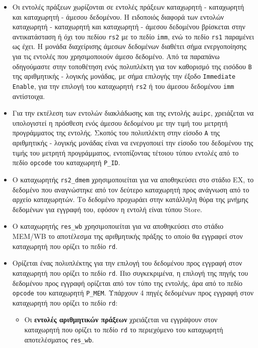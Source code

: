 \documentclass[11pt]{extarticle}
\begin{document}
\begin{itemize}
    \item Οι εντολές πράξεων χωρίζονται σε εντολές πράξεων καταχωρητή - καταχωρητή και καταχωρητή - άμεσου δεδομένου.
    Η ειδοποιός διαφορά των εντολών καταχωρητή - καταχωρητή και καταχωρητή - άμεσου δεδομένου βρίσκεται στην αντικατάσταση ή όχι του πεδίου \texttt{rs2} με το πεδίο \texttt{imm}, ενώ το πεδίο \texttt{rs1} παραμένει ως έχει.
    Η μονάδα διαχείρισης άμεσων δεδομένων διαθέτει σήμα ενεργοποίησης για τις εντολές που χρησιμοποιούν άμεσο δεδομένο.
    Από τα παραπάνω οδηγούμαστε στην τοποθέτηση ενός πολυπλέκτη για τον καθορισμό της εισόδου \texttt{B} της αριθμητικής - λογικής μονάδας, με σήμα επιλογής την έξοδο \texttt{Immediate Enable}, για την επιλογή του καταχωρητή \texttt{rs2} ή του άμεσου δεδομένου \texttt{imm} αντίστοιχα.
    \item Για την εκτέλεση των εντολών διακλάδωσης και της εντολής \texttt{auipc}, χρειάζεται να υπολογιστεί η πρόσθεση ενός άμεσου δεδομένου με την τιμή του μετρητή προγράμματος της εντολής.
    Σκοπός του πολυπλέκτη στην είσοδο \texttt{A} της αριθμητικής - λογικής μονάδας είναι να ενεργοποιεί την είσοδο του δεδομένου της τιμής του μετρητή προγράμματος, εντοπίζοντας τέτοιου τύπου εντολές από το πεδίο \texttt{opcode} του καταχωρητή \texttt{P\_ID}.
    \item Ο καταχωρητής \texttt{rs2\_dmem} χρησιμοποιείται για να αποθηκεύσει στο στάδιο EX, το δεδομένο που αναγνώστηκε από τον δεύτερο καταχωρητή προς ανάγνωση από το αρχείο καταχωρητών.
    Το δεδομένο προχωράει στην κατάλληλη θύρα της μνήμης δεδομένων για εγγραφή του, εφόσον η εντολή είναι τύπου Store.
    \item Ο καταχωρητής \texttt{res\_wb} χρησιμοποιείται για να αποθηκεύσει στο στάδιο MEM/WB το αποτέλεσμα της αριθμητικής πράξης το οποίο θα εγγραφεί στον καταχωρητή που ορίζει το πεδίο \texttt{rd}.
    \newpage
    \item Ορίζεται ένας πολυπλέκτης για την επιλογή του δεδομένου προς εγγραφή στον καταχωρητή που ορίζει το πεδίο \texttt{rd}.
    Πιο συγκεκριμένα, η επιλογή της πηγής του δεδομένου προς εγγραφή ορίζεται από τον τύπο της εντολής, άρα από το πεδίο \texttt{opcode} του καταχωρητή \texttt{P\_MEM}.
    Υπάρχουν 4 πηγές δεδομένων προς εγγραφή στον καταχωρητή που ορίζει το πεδίο \texttt{rd}:
    \begin{itemize}
        \item Οι \textbf{εντολές αριθμητικών πράξεων} χρειάζεται να εγγράψουν στον καταχωρητή που ορίζει το πεδίο \texttt{rd} το περιεχόμενο του καταχωρητή αποτελέσματος \texttt{res\_wb}.

\end{itemize}
\end{itemize}
\end{document}
